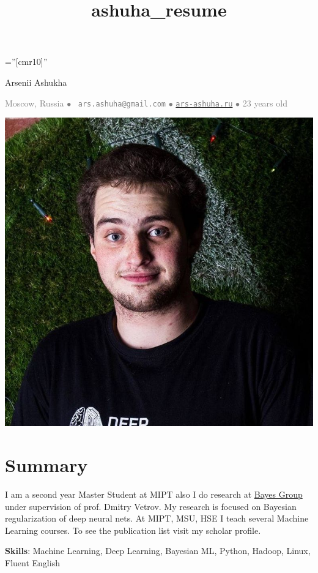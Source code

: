 \documentclass[a4paper,10pt]{article} %
\title{ashuha_resume}
\begin{document}
\pagestyle{empty} %

\font\fb=''[cmr10]'' %
\oddsidemargin=0pt 		%

\begin{center}
	{\huge Arsenii Ashukha}
\end{center}
\begin{center}
\textcolor{gray}{
Moscow, Russia $\bullet$ 
\Letter~\textcolor{gray}{\texttt{ars.ashuha@gmail.com}} $\bullet$ \href{https://ars-ashuha.ru/}{\textcolor{gray}{\texttt{ars-ashuha.ru}}} $\bullet$
23 years old \smiley} 

\end{center}
\setlength{\columnsep}{-330pt}
\begin{multicols}{2}
\includegraphics[scale=0.13]{img/avatar_rect2}

\section{Summary}
 \vspace{-0.2cm}

I am a second year Master Student at MIPT also I do research at \href{bayesgroup.ru}{Bayes Group} under supervision of prof. Dmitry Vetrov. My research is focused on Bayesian regularization of deep neural nets. At MIPT, MSU, HSE I teach several Machine Learning courses. To see the publication list visit my scholar profile.

\vspace{0.2cm}
\textbf{Skills}: Machine Learning, Deep Learning, Bayesian ML, Python, Hadoop, Linux, Fluent English

\end{multicols}
\end{document}

